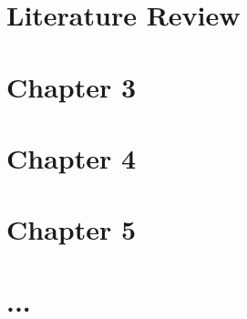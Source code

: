 \documentclass[11pt]{gsasthesis} %
\begin{document}
\chapter{Literature Review}\label{ch:background}


\chapter{Chapter 3}\label{ch:ate}

\chapter{Chapter 4}

\chapter{Chapter 5}

\chapter{...}





\begin{singlespacing}
  \renewcommand{\bibname}{References}

  
  
\end{singlespacing}

%
\end{document}

